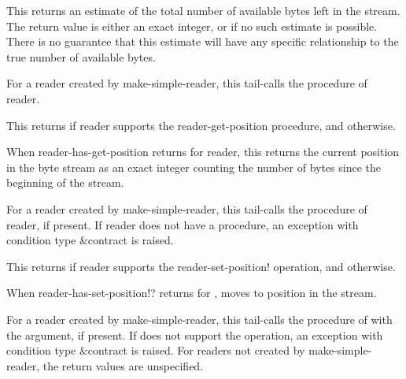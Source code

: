 \begin{entry}{%
}
   
This returns an estimate of the total number of available bytes left in the
stream. The return value is either an exact integer, or \schfalse{} if no such
estimate is possible. There is no guarantee that this estimate will have
any specific relationship to the true number of available bytes.
   
For a reader created by {\cf make-simple-reader}, this tail-calls the 
procedure of reader.
\end{entry}   

\begin{entry}{%
}
   
This returns \schtrue{} if reader supports the reader-get-position
procedure, and \schfalse{} otherwise.
\end{entry}

\begin{entry}{%
}
   
When {\cf reader-has-get-position} returns \schtrue{} for reader, this
returns the current position in the byte stream as an exact integer
counting the number of bytes since the beginning of the stream.
   
For a reader created by {\cf make-simple-reader}, this tail-calls the
 procedure of reader, if present. If reader does not
have a  procedure, an exception with condition type
{\cf\&contract} is raised.
\end{entry}

\begin{entry}{%
}
   
This returns \schtrue{} if reader supports the {\cf reader-set-position!} operation, and
\schfalse{} otherwise.
\end{entry}

\begin{entry}{%
}

When {\cf reader-has-set-position!?} returns \schtrue{} for
, moves to position  in the stream.
 
For a reader created by {\cf make-simple-reader}, this tail-calls the
  procedure of  with the 
argument, if present.  If  does not support the operation,
an {\cf exception} with condition type {\cf\&contract} is raised.
For readers not created by {\cf make-simple-reader}, the return values
are unspecified.
\end{entry}


